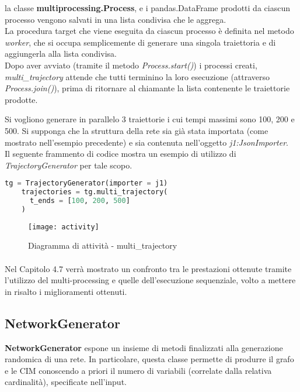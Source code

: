   la classe \textbf{multiprocessing.Process}, e i pandas.DataFrame prodotti da ciascun processo vengono
  salvati in una lista condivisa che le aggrega.\\
  La procedura target che viene eseguita da ciascun processo è definita nel metodo \textit{worker},
  che si occupa semplicemente di generare una singola traiettoria e di aggiungerla alla lista
  condivisa.\\
  Dopo aver avviato (tramite il metodo \textit{Process.start()}) i processi creati, \textit{multi\_trajectory}
  attende che tutti terminino la loro esecuzione (attraverso \textit{Process.join()}), prima di ritornare al chiamante
  la lista contenente le traiettorie prodotte.

  \begin{exmp}
    Si vogliono generare in parallelo 3 traiettorie i cui tempi massimi sono 100, 200 e 500.
    Si supponga che la struttura della rete sia già stata importata (come mostrato nell'esempio
    precedente) e sia contenuta nell'oggetto \emph{j1:JsonImporter}.\\
    Il seguente frammento di codice mostra un esempio di utilizzo di \emph{TrajectoryGenerator} per tale
    scopo.
  \end{exmp}

  \begin{lstlisting}[language=python]
    tg = TrajectoryGenerator(importer = j1)
    trajectories = tg.multi_trajectory(
      t_ends = [100, 200, 500]
    )
  \end{lstlisting}

  \begin{figure}[H]
    \texttt{[image: activity]}
    \centering
    \caption{Diagramma di attività - multi\_trajectory}
  \end{figure}

  \paragraph{}
  Nel Capitolo 4.7 verrà mostrato un confronto tra le prestazioni ottenute tramite l'utilizzo del multi-processing e quelle dell'esecuzione sequenziale,
  volto a mettere in risalto i miglioramenti ottenuti.

  \subsection{NetworkGenerator}
  \textbf{NetworkGenerator} espone un insieme di metodi finalizzati alla generazione randomica di una rete.
  In particolare, questa classe permette di produrre il grafo e le CIM conoscendo a priori il numero di variabili (correlate dalla relativa cardinalità), 
  specificate nell'input.
  
